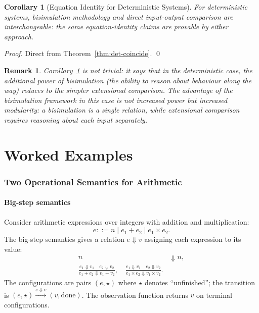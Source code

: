 \documentclass[twocolumn,11pt,a4paper]{article}
\newtheorem{corollary}[theorem]{Corollary}
\newtheorem{remark}[theorem]{Remark}
\begin{document}
\begin{corollary}[Equation Identity for Deterministic Systems]
\label{cor:det-equation}
For deterministic systems, bisimulation methodology and direct input-output comparison are interchangeable: the same equation-identity claims are provable by either approach.
\end{corollary}

\begin{proof}
Direct from Theorem~\ref{thm:det-coincide}. \qed
\end{proof}

\begin{remark}
Corollary~\ref{cor:det-equation} is not trivial: it says that in the deterministic case, the additional power of bisimulation (the ability to reason about behaviour along the way) reduces to the simpler extensional comparison. The advantage of the bisimulation framework in this case is not increased power but increased modularity: a bisimulation is a single relation, while extensional comparison requires reasoning about each input separately.
\end{remark}

\part{Worked Examples}

\section{Two Operational Semantics for Arithmetic}
\label{sec:arith-example}

\subsection{Big-step semantics}

Consider arithmetic expressions over integers with addition and multiplication:
\[
e ::= n \mid e_1 + e_2 \mid e_1 \times e_2.
\]
The big-step semantics gives a relation $e \Downarrow v$ assigning each expression to its value:
\begin{align*}
n &\Downarrow n, \\
\frac{e_1 \Downarrow v_1 \quad e_2 \Downarrow v_2}{e_1 + e_2 \Downarrow v_1 + v_2}, \quad
\frac{e_1 \Downarrow v_1 \quad e_2 \Downarrow v_2}{e_1 \times e_2 \Downarrow v_1 \times v_2}.
\end{align*}
The configurations are pairs $(e, \star)$ where $\star$ denotes ``unfinished''; the transition is $(e, \star) \xrightarrow{e \Downarrow v} (v, \mathrm{done})$. The observation function returns $v$ on terminal configurations.
\end{document}
